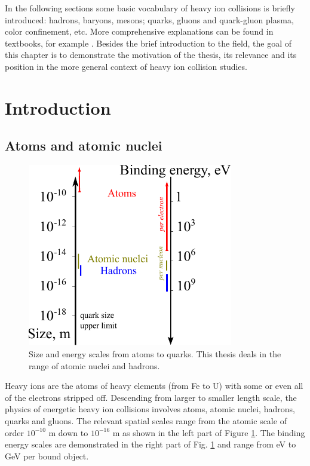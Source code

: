 In the following sections some basic vocabulary of heavy ion collisions is
briefly introduced: hadrons, baryons, mesons; quarks, gluons and quark-gluon plasma,
color confinement, etc.  More comprehensive explanations can be found in
textbooks, for example \cite{satz2012extreme}.  Besides the brief introduction to the
field, the goal of this chapter is to demonstrate the motivation of the thesis, its
relevance and its position in the more general context of heavy ion collision
studies.

\section{Introduction}

\subsection{Atoms and atomic nuclei}

\begin{figure}
  \centering
  \includegraphics[height = 8cm]{illustrations/intro_illustrations/scales.pdf}
  \caption{Size and energy scales from atoms to quarks. This thesis deals in the
           range of atomic nuclei and hadrons.}
  \label{fig:scales}
\end{figure}

Heavy ions are the atoms of heavy elements (from Fe to U) with some or even all
of the electrons stripped off. Descending from larger to smaller length scale,
the physics of energetic heavy ion collisions involves atoms,
atomic nuclei, hadrons, quarks and gluons. The relevant spatial scales range
from the atomic scale of order $10^{-10}$ m down to
$10^{-16}$ m as shown in the left part of Figure \ref{fig:scales}. The
binding energy scales are demonstrated in the right part of Fig.
\ref{fig:scales} and range from eV to GeV per bound object.

